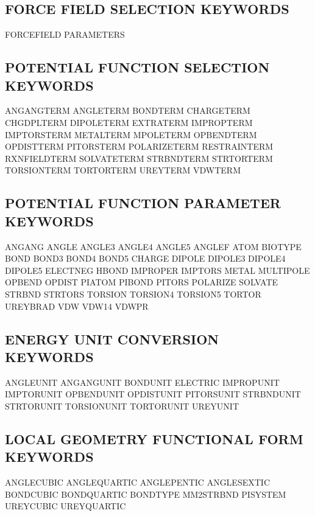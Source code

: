 \documentclass[letterpaper,11pt,english]{sphinxmanual}
\begin{document}
\subsection{FORCE FIELD SELECTION KEYWORDS}
\label{\detokenize{text/keywords:force-field-selection-keywords}}
FORCEFIELD      PARAMETERS


\subsection{POTENTIAL FUNCTION SELECTION KEYWORDS}
\label{\detokenize{text/keywords:potential-function-selection-keywords}}
ANGANGTERM      ANGLETERM       BONDTERM
CHARGETERM      CHGDPLTERM      DIPOLETERM
EXTRATERM       IMPROPTERM      IMPTORSTERM
METALTERM       MPOLETERM       OPBENDTERM
OPDISTTERM      PITORSTERM      POLARIZETERM
RESTRAINTERM    RXNFIELDTERM    SOLVATETERM
STRBNDTERM      STRTORTERM      TORSIONTERM
TORTORTERM      UREYTERM        VDWTERM


\subsection{POTENTIAL FUNCTION PARAMETER KEYWORDS}
\label{\detokenize{text/keywords:potential-function-parameter-keywords}}
ANGANG  ANGLE   ANGLE3
ANGLE4  ANGLE5  ANGLEF
ATOM    BIOTYPE BOND
BOND3   BOND4   BOND5
CHARGE  DIPOLE  DIPOLE3
DIPOLE4 DIPOLE5 ELECTNEG
HBOND   IMPROPER        IMPTORS
METAL   MULTIPOLE       OPBEND
OPDIST  PIATOM  PIBOND
PITORS  POLARIZE        SOLVATE
STRBND  STRTORS TORSION
TORSION4        TORSION5        TORTOR
UREYBRAD        VDW     VDW14
VDWPR


\subsection{ENERGY UNIT CONVERSION KEYWORDS}
\label{\detokenize{text/keywords:energy-unit-conversion-keywords}}
ANGLEUNIT       ANGANGUNIT      BONDUNIT
ELECTRIC        IMPROPUNIT      IMPTORUNIT
OPBENDUNIT      OPDISTUNIT      PITORSUNIT
STRBNDUNIT      STRTORUNIT      TORSIONUNIT
TORTORUNIT      UREYUNIT


\subsection{LOCAL GEOMETRY FUNCTIONAL FORM KEYWORDS}
\label{\detokenize{text/keywords:local-geometry-functional-form-keywords}}
ANGLE\sphinxhyphen{}CUBIC     ANGLE\sphinxhyphen{}QUARTIC   ANGLE\sphinxhyphen{}PENTIC
ANGLE\sphinxhyphen{}SEXTIC    BOND\sphinxhyphen{}CUBIC      BOND\sphinxhyphen{}QUARTIC
BONDTYPE        MM2\sphinxhyphen{}STRBND      PISYSTEM
UREY\sphinxhyphen{}CUBIC      UREY\sphinxhyphen{}QUARTIC
\end{document}
